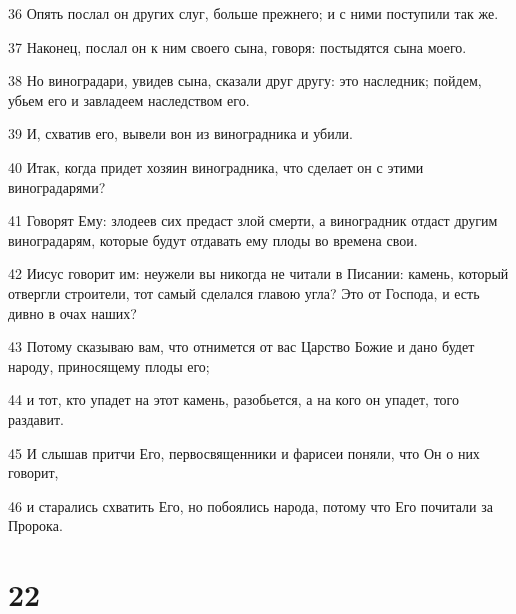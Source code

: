 \par 36 Опять послал он других слуг, больше прежнего; и с ними поступили так же.
\par 37 Наконец, послал он к ним своего сына, говоря: постыдятся сына моего.
\par 38 Но виноградари, увидев сына, сказали друг другу: это наследник; пойдем, убьем его и завладеем наследством его.
\par 39 И, схватив его, вывели вон из виноградника и убили.
\par 40 Итак, когда придет хозяин виноградника, что сделает он с этими виноградарями?
\par 41 Говорят Ему: злодеев сих предаст злой смерти, а виноградник отдаст другим виноградарям, которые будут отдавать ему плоды во времена свои.
\par 42 Иисус говорит им: неужели вы никогда не читали в Писании: камень, который отвергли строители, тот самый сделался главою угла? Это от Господа, и есть дивно в очах наших?
\par 43 Потому сказываю вам, что отнимется от вас Царство Божие и дано будет народу, приносящему плоды его;
\par 44 и тот, кто упадет на этот камень, разобьется, а на кого он упадет, того раздавит.
\par 45 И слышав притчи Его, первосвященники и фарисеи поняли, что Он о них говорит,
\par 46 и старались схватить Его, но побоялись народа, потому что Его почитали за Пророка.

\chapter{22}

